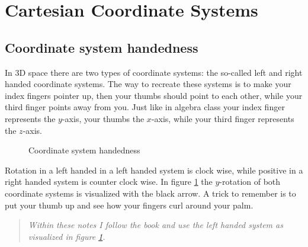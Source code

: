 \documentclass[a4paper,11pt]{article}
\begin{document}
\newpage
\section{Cartesian Coordinate Systems}

\subsection{Coordinate system handedness}

In 3D space there are two types of coordinate systems: the so-called left and right handed coordinate systems. The way to recreate these systems is to make your index fingers pointer up, then your thumbs should point to each other, while your third finger points away from you. Just like in algebra class your index finger represents the $y$-axis, your thumbs the $x$-axis, while your third finger represents the $z$-axis.

\begin{figure}[H]
\centering
\caption{Coordinate system handedness}
\label{fig:coordinate-system-handedness}
\end{figure}

Rotation in a left handed in a left handed system is clock wise, while positive in a right handed system is counter clock wise. In figure  \ref{fig:coordinate-system-handedness} the $y$-rotation of both  coordinate systems is visualized with the black arrow. A trick to remember is to put your thumb up and see how your fingers curl around your palm.

\begin{quote}
\emph{Within these notes I follow the book and use the left handed system as visualized in figure \ref{fig:coordinate-system-handedness}.}
\end{quote}
\end{document}
